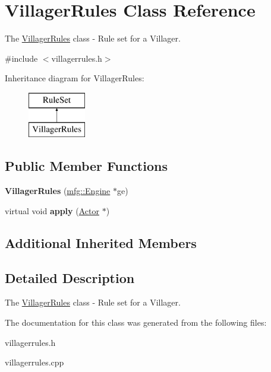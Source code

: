 \hypertarget{class_villager_rules}{}\section{Villager\+Rules Class Reference}
\label{class_villager_rules}


The \hyperlink{class_villager_rules}{Villager\+Rules} class -\/ Rule set for a Villager.  




{\ttfamily \#include $<$villagerrules.\+h$>$}

Inheritance diagram for Villager\+Rules\+:\begin{figure}[H]
\begin{center}
\leavevmode
\includegraphics[height=2.000000cm]{class_villager_rules}
\end{center}
\end{figure}
\subsection*{Public Member Functions}
\begin{DoxyCompactItemize}
\item 
\mbox{\label{class_villager_rules_a7c23dd17126f9d1c1e1b9ada7f965bff}} 
{\bfseries Villager\+Rules} (\hyperlink{classmfg_1_1_engine}{mfg\+::\+Engine} $\ast$ge)
\item 
\mbox{\label{class_villager_rules_ac78c4a1461517c37bd860033a82b75d3}} 
virtual void {\bfseries apply} (\hyperlink{class_actor}{Actor} $\ast$)
\end{DoxyCompactItemize}
\subsection*{Additional Inherited Members}


\subsection{Detailed Description}
The \hyperlink{class_villager_rules}{Villager\+Rules} class -\/ Rule set for a Villager. 

The documentation for this class was generated from the following files\+:\begin{DoxyCompactItemize}
\item 
villagerrules.\+h\item 
villagerrules.\+cpp\end{DoxyCompactItemize}

